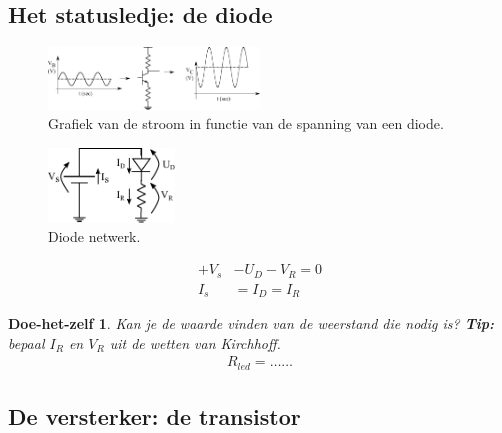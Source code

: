 \documentclass{article}
\newtheorem{DIY}{Doe-het-zelf}
\begin{document}
\vspace{30ex}
		\subsection{Het statusledje: de diode}
			

				\begin{figure}[htbp]
					\centering
					\includegraphics[width=0.5\textwidth]{diode_grafiek}
					\caption{Grafiek van de stroom in functie van de spanning van een diode.}
					\label{fig:diode_grafiek}
				\end{figure}


			\begin{figure}[htbp]
				\centering
				\includegraphics[width=0.3\textwidth]{diode_netwerk}
				\caption{Diode netwerk.}
				\label{fig:diode_netwerk}
			\end{figure}

			\begin{align}
				+V_s &- U_D - V_R = 0  \\
				I_s &= I_D = I_R
			\end{align}

			\begin{DIY} Kan je de waarde vinden van de weerstand die nodig is? \textbf{Tip:} bepaal $I_R$ en $V_R$ uit de wetten van Kirchhoff.
			\begin{align*}
			    R_{led} = \ldots\ldots
			\end{align*}
			\end{DIY}
\vspace{30ex}

		\subsection{De versterker: de transistor}
			
\end{document}
